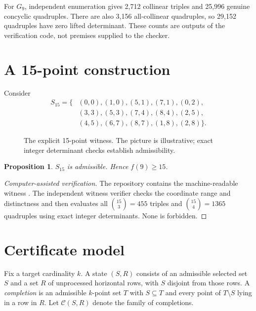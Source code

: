 \documentclass[11pt,a4paper]{article}
\newtheorem{proposition}[theorem]{Proposition}
\theoremstyle{definition}
\theoremstyle{remark}
\newcommand{\C}{\mathcal C}
\begin{document}
For $G_9$, independent enumeration gives 2,712 collinear triples and 25,996
genuine concyclic quadruples. There are also 3,156 all-collinear quadruples,
so 29,152 quadruples have zero lifted determinant. These counts are outputs of
the verification code, not premises supplied to the checker.

\section{A 15-point construction}\label{sec:lower}
Consider
\begin{align*}
S_{15}=\{&(0,0),(1,0),(5,1),(7,1),(0,2),\\
&(3,3),(5,3),(7,4),(8,4),(2,5),\\
&(4,5),(6,7),(8,7),(1,8),(2,8)\}.
\end{align*}

\begin{figure}[ht]
\centering
{}
\caption{The explicit 15-point witness. The picture is illustrative; exact
integer determinant checks establish admissibility.}
\end{figure}

\begin{proposition}\label{prop:lower}
$S_{15}$ is admissible. Hence $f(9)\ge15$.
\end{proposition}
\begin{proof}[Computer-assisted verification]
The repository contains the machine-readable witness
. The independent witness verifier checks the
coordinate range and distinctness and then evaluates all
$\binom{15}{3}=455$ triples and $\binom{15}{4}=1365$ quadruples using exact
integer determinants. None is forbidden.
\end{proof}

\section{Certificate model}\label{sec:model}
Fix a target cardinality $k$. A state $(S,R)$ consists of an admissible
selected set $S$ and a set $R$ of unprocessed horizontal rows, with $S$
disjoint from those rows. A \emph{completion} is an admissible $k$-point set
$T$ with $S\subseteq T$ and every point of $T\setminus S$ lying in a row in
$R$. Let $\C(S,R)$ denote the family of completions.
\end{document}
